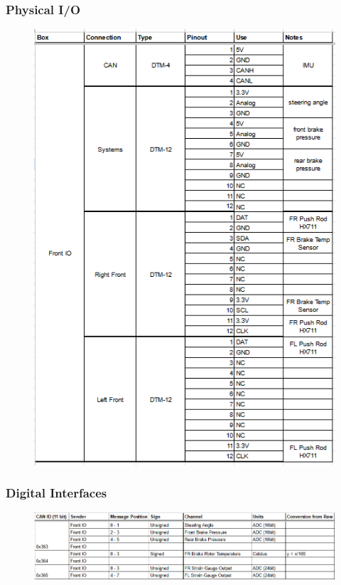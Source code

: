 \subsubsection{Physical I/O}
\begin{figure}[H]
    \centering
    \includegraphics[width=5.5in]{images/pioio.png}
\end{figure}
\subsubsection{Digital Interfaces}
\begin{figure}[H]
    \centering
    \includegraphics[width=7in]{images/dioio.png}
\end{figure}